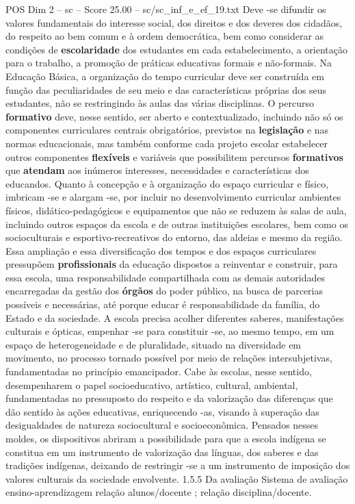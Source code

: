 \begin{textsample}{POS Dim 2 – sc – Score 25.00 – sc/sc\_inf\_e\_ef\_19.txt}
Deve -se difundir os valores fundamentais do interesse social, dos direitos e dos deveres dos cidadãos, do respeito ao bem comum e à ordem democrática, bem como considerar as condições de \textbf{escolaridade} dos estudantes em cada estabelecimento, a orientação para o trabalho, a promoção de práticas educativas formais e não-formais.
Na Educação Básica, a organização do tempo curricular deve ser construída em função das peculiaridades de seu meio e das características próprias dos seus estudantes, não se restringindo às aulas das várias disciplinas.
O percurso \textbf{formativo} deve, nesse sentido, ser aberto e contextualizado, incluindo não só os componentes curriculares centrais obrigatórios, previstos na \textbf{legislação} e nas normas educacionais, mas também conforme cada projeto escolar estabelecer outros componentes \textbf{flexíveis} e variáveis que possibilitem percursos \textbf{formativos} que \textbf{atendam} aos inúmeros interesses, necessidades e características dos educandos.
Quanto à concepção e à organização do espaço curricular e físico, imbricam -se e alargam -se, por incluir no desenvolvimento curricular ambientes físicos, didático-pedagógicos e equipamentos que não se reduzem às salas de aula, incluindo outros espaços da escola e de outras instituições escolares, bem como os socioculturais e esportivo-recreativos do entorno, das aldeias e mesmo da região.
Essa ampliação e essa diversificação dos tempos e dos espaços curriculares pressupõem \textbf{profissionais} da educação dispostos a reinventar e construir, para essa escola, uma responsabilidade compartilhada com as demais autoridades encarregadas da gestão dos \textbf{órgãos} do poder público, na busca de parcerias possíveis e necessárias, até porque educar é responsabilidade da família, do Estado e da sociedade.
A escola precisa acolher diferentes saberes, manifestações culturais e ópticas, empenhar -se para constituir -se, ao mesmo tempo, em um espaço de heterogeneidade e de pluralidade, situado na diversidade em movimento, no processo tornado possível por meio de relações intersubjetivas, fundamentadas no princípio emancipador.
Cabe às escolas, nesse sentido, desempenharem o papel socioeducativo, artístico, cultural, ambiental, fundamentadas no pressuposto do respeito e da valorização das diferenças que dão sentido às ações educativas, enriquecendo -as, visando à superação das desigualdades de natureza sociocultural e socioeconômica.
Pensados nesses moldes, os dispositivos abriram a possibilidade para que a escola indígena se constitua em um instrumento de valorização das línguas, dos saberes e das tradições indígenas, deixando de restringir -se a um instrumento de imposição dos valores culturais da sociedade envolvente. 1.5.5 Da avaliação Sistema de avaliação ensino-aprendizagem relação alunos/docente ; relação disciplina/docente.

\end{textsample}
